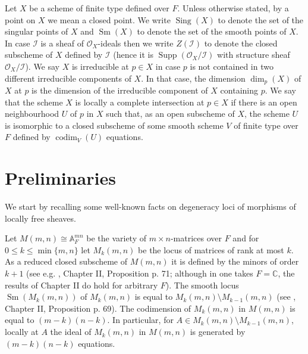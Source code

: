 \documentclass{article}
\DeclareMathOperator{\codim}{codim}
\DeclareMathOperator{\Sm}{Sm}
\DeclareMathOperator{\Sing}{Sing}
\DeclareMathOperator{\Supp}{Supp}
\theoremstyle{definition}
\theoremstyle{remark}
\begin{document}
Let $X$ be a scheme of finite type defined over $F$.
Unless otherwise stated, by a point on $X$ we mean a closed point.
We write $\Sing (X)$ to denote the set of the singular points of $X$ and $\Sm (X)$ to denote the set of the smooth points of $X$.
In case $\mathcal{I}$ is a sheaf of $\mathcal{O}_X$-ideals then we write $Z(\mathcal{I})$ to denote the closed subscheme of $X$ defined by $\mathcal{I}$ (hence it is $\Supp (\mathcal{O}_X / \mathcal {I})$ with structure sheaf $\mathcal {O}_X / \mathcal{I}$).
We say $X$ is irreducible at $p \in X$ in case $p$ is not contained in two different irreducible components of $X$.
In that case, the dimension $\dim_p(X)$ of $X$ at $p$ is the dimension of the irreducible component of $X$ containing $p$.
We say that the scheme $X$ is locally a complete intersection at $p \in X$ if there is an open neighbourhood $U$ of $p$ in $X$ such that, as an open subscheme of $X$, the scheme $U$ is isomorphic to a closed subscheme of some smooth scheme $V$ of finite type over $F$ defined by $\codim _V (U)$ equations.
\section{Preliminaries}\label{section2}

We start by recalling some well-known facts on degeneracy loci of morphisms of locally free sheaves.

Let $M(m,n)\cong \mathbb{A}^{mn}_F$ be the variety of $m \times n$-matrices over $F$ and for $0 \leq k \leq \min \{m,n\}$ let $M_k(m,n)$ be the locus of matrices of rank at most $k$.
As a reduced closed subscheme of $M(m,n)$ it is defined by the minors of order $k+1$ (see e.g. \cite{ref9}, Chapter II, Proposition p. 71; although in \cite{ref9} one takes $F=\mathbb{C}$, the results of Chapter II do hold for arbitrary $F$).
The smooth locus $\Sm (M_k(m,n))$ of $M_k(m,n)$ is equal to $M_k(m,n)\setminus M_{k-1}(m,n)$ (see \cite {ref9}, Chapter II, Proposition p. 69).
The codimension of $M_k(m,n)$ in $M(m,n)$ is equal to $(m-k)(n-k)$.
In particular, for $A \in M_k(m,n) \setminus M_{k-1}(m,n)$, locally at $A$ the ideal of $M_k(m,n)$ in $M(m,n)$ is generated by $(m-k)(n-k)$ equations.
\end{document}
